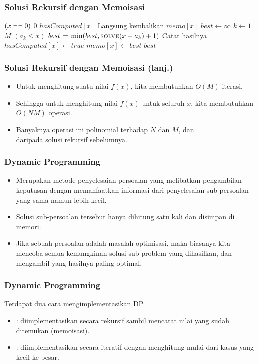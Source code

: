 \begin{frame}
\frametitle{Solusi Rekursif dengan Memoisasi}
\begin{codebox}
\li \If $(x \isequal 0)$ \Then
\li   \Return $0$
\li \ElseIf $hasComputed[x]$ \Then
\li   \Comment Langsung kembalikan
\li   \Return $memo[x]$ 
\li \Else
\li   $best \gets \infty$
\li   \For $k \gets 1$ \To $M$ \Do
\li     \If $(a_k \leq x)$ \Then
\li       $best \mathrel{\hspace{1pt}=\hspace{1pt}} \min(best, \textnormal{\scshape solve}(x - a_k) + 1)$
        \End
      \End
\li   \Comment Catat hasilnya      
\li   $hasComputed[x] \gets true$
\li   $memo[x] \gets best$
\li   \Return $best$
    \End
\end{codebox}
\end{frame}

\begin{frame}
\frametitle{Solusi Rekursif dengan Memoisasi (lanj.)}
\begin{itemize}
  \item Untuk menghitung suatu nilai $f(x)$, kita membutuhkan $O(M)$ iterasi.
  \item Sehingga untuk menghitung nilai $f(x)$ untuk seluruh $x$, kita membutuhkan $O(NM)$ operasi.
  \item Banyaknya operasi ini polinomial terhadap $N$ dan $M$, dan \\  daripada solusi rekursif sebelumnya.
\end{itemize}
\end{frame}

\begin{frame} 
\frametitle{Dynamic Programming}
\begin{itemize}
  \item Merupakan metode penyelesaian persoalan yang melibatkan pengambilan keputusan dengan memanfaatkan informasi dari penyelesaian sub-persoalan yang sama namun lebih kecil.
  \item Solusi sub-persoalan tersebut hanya dihitung satu kali dan disimpan di memori.
  \item Jika sebuah persoalan adalah masalah optimisasi, maka biasanya kita mencoba semua kemungkinan solusi sub-problem yang dihasilkan, dan  mengambil yang hasilnya paling optimal. 
\end{itemize}
\end{frame}

\begin{frame} 
\frametitle{Dynamic Programming}
Terdapat dua cara mengimplementasikan DP
\begin{itemize}
  \item \newTerm{\fTopdown}: diimplementasikan secara rekursif sambil mencatat nilai yang sudah ditemukan (memoisasi).
  \item \newTerm{\fBottomup}: diimplementasikan secara iteratif dengan menghitung mulai dari kasus yang kecil ke besar.
  \newline
\end{itemize}
\end{frame}

